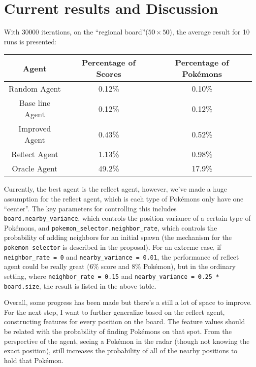 \documentclass[12pt]{article}
\begin{document}
\section*{Current results and Discussion}
With 30000 iterations, on the ``regional board''($50 \times 50$), the average
result for 10 runs is presented:
\begin{center}
\begin{tabular}{|c | c c|} 
\hline
Agent & Percentage of Scores& Percentage of Pok\'emons \\
\hline
\hline
Random Agent & 0.12\% & 0.10\% \\ 
\hline
Base line Agent & 0.12\% & 0.12\% \\
\hline
Improved Agent & 0.43\% & 0.52\% \\
\hline
Reflect Agent & 1.13\% & 0.98\%  \\
\hline
Oracle Agent & 49.2\% & 17.9\% \\
\hline
\end{tabular}
\end{center}
Currently, the best agent is the reflect agent, however, 
we've made a huge
assumption for the reflect agent, which is each type of Pok\'emons
only have one ``center''. The key parameters for controlling this includes
\texttt{board.nearby\_variance}, which controls the position variance 
of a certain type of Pok\'emons, and \texttt{pokemon\_selector.neighbor\_rate},
which controls the probability of adding neighbors for an
initial spawn (the mechanism for the \texttt{pokemon\_selector} is described 
in the proposal). For an extreme case, if \texttt{neighbor\_rate = 0}
and \texttt{nearby\_variance = 0.01}, the performance of reflect agent could
be really great (6\% score and 8\% Pok\'emon), but in the ordinary setting, 
where \texttt{neighbor\_rate = 0.15} and \texttt{nearby\_variance = 0.25 * board.size}, the result is listed in the above table.
\par
Overall, some progress has been made but there's a still 
a lot of space to improve. 
For the next step, I want to further generalize based
on the reflect agent, constructing features for every position on the board.
The feature values should be related with the probability of finding 
Pok\'emons on that spot. 
From the perspective of the agent, seeing a
Pok\'emon in the radar (though not knowing the exact position), still
increases the probability of all of the nearby positions to hold that Pok\'emon.
\end{document}
